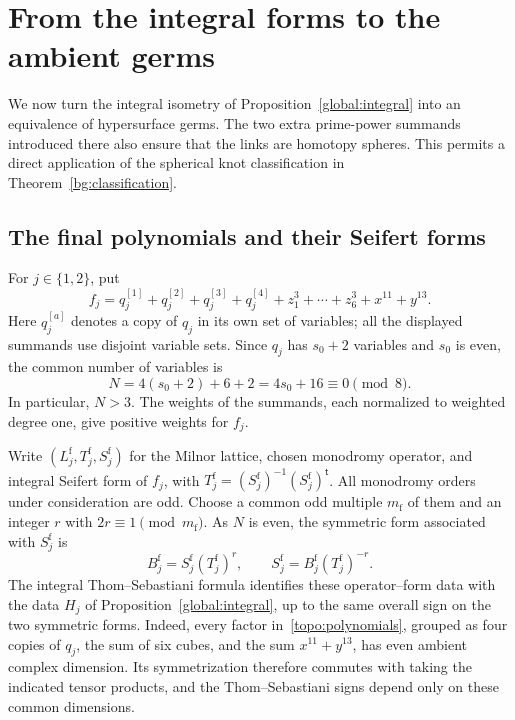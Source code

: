 \section{From the integral forms to the ambient germs}
\label{topo:section}

We now turn the integral isometry of Proposition~\ref{global:integral}
into an equivalence of hypersurface germs.  The two extra prime-power
summands introduced there also ensure that the links are
homotopy spheres.  This permits a direct application of the spherical
knot classification in Theorem~\ref{bg:classification}.

\subsection{The final polynomials and their Seifert forms}

For $j\in\{1,2\}$, put
\begin{equation}
\label{topo:polynomials}
 f_j=q_j^{[1]}+q_j^{[2]}+q_j^{[3]}+q_j^{[4]}
       +z_1^3+\cdots+z_6^3+x^{11}+y^{13}.
\end{equation}
Here $q_j^{[a]}$ denotes a copy of $q_j$ in its own set of variables;
all the displayed summands use disjoint variable sets.  Since $q_j$
has $s_0+2$ variables and $s_0$ is even, the common number of variables is
\begin{equation}
\label{topo:dimension}
 N=4(s_0+2)+6+2=4s_0+16\equiv0\pmod 8.
\end{equation}
In particular, $N>3$.  The weights of the summands, each normalized to
weighted degree one, give positive weights for $f_j$.

Write $(L_j^{\mathrm f},T_j^{\mathrm f},S_j^{\mathrm f})$ for the
Milnor lattice, chosen monodromy operator, and integral Seifert form of $f_j$,
with $T_j^{\mathrm f}=(S_j^{\mathrm f})^{-1}(S_j^{\mathrm f})^{\mathsf t}$.
All monodromy orders under consideration are odd.  Choose a common
odd multiple $m_{\mathrm f}$ of them and an integer $r$ with
$2r\equiv1\pmod {m_{\mathrm f}}$.
As $N$ is even, the symmetric form associated with $S_j^{\mathrm f}$ is
\[
 B_j^{\mathrm f}=S_j^{\mathrm f}(T_j^{\mathrm f})^r,
 \qquad
 S_j^{\mathrm f}=B_j^{\mathrm f}(T_j^{\mathrm f})^{-r}.
\]
The integral Thom--Sebastiani formula identifies these operator--form
data with the data $H_j$ of Proposition~\ref{global:integral}, up to the
same overall sign on the two symmetric forms.  Indeed, every factor
in~\eqref{topo:polynomials}, grouped as four copies of $q_j$, the sum
of six cubes, and the sum $x^{11}+y^{13}$, has even ambient complex
dimension.  Its
symmetrization therefore commutes with taking the indicated tensor
products, and the Thom--Sebastiani signs depend only on these common
dimensions.

